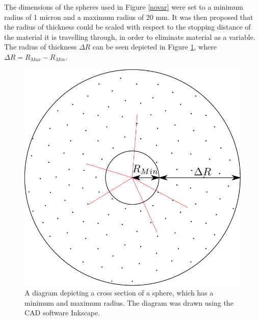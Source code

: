 \documentclass[12pt,a4paper]{article}
\begin{document}
\noindent The dimensions of the spheres used in Figure \ref{novar} were set to a minimum radius of 1 micron and a maximum radius of 20 mm. It was then proposed that the radius of thickness could be scaled with respect to the stopping distance of the material it is travelling through, in order to eliminate material as a variable. The radius of thickness $\Delta R$ can be seen depicted in Figure \ref{deltar}, where $\Delta R = R_{Max} - R_{Min}$.

\begin{figure}[h!]
\centering
\includegraphics[scale=0.2]{Images//Materials//RMAX.png}
\caption[width=\columnwidth]{A diagram depicting a cross section of a sphere, which has a minimum and maximum radius. The diagram was drawn using the CAD software Inkscape.}
\label{deltar}
\end{figure}

\newpage
\end{document}
